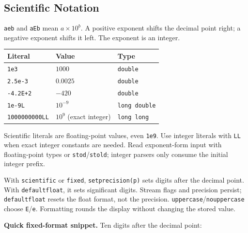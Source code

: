 \begingroup
\raggedright
\subsection{Scientific Notation}
\texttt{aeb} and \texttt{aEb} mean $a\times10^b$. A positive
exponent shifts the decimal point right; a negative exponent shifts
it left. The exponent is an integer.

\begin{center}
\begin{tabular}{lll}
\textbf{Literal} & \textbf{Value} & \textbf{Type} \\
\hline
\texttt{1e3} & $1000$ & \texttt{double} \\
\texttt{2.5e-3} & $0.0025$ & \texttt{double} \\
\texttt{-4.2E+2} & $-420$ & \texttt{double} \\
\texttt{1e-9L} & $10^{-9}$ & \texttt{long double} \\
\texttt{1000000000LL} & $10^9$ (exact integer) & \texttt{long long} \\
\end{tabular}
\end{center}
Scientific literals are floating-point values, even \texttt{1e9}.
Use integer literals with \texttt{LL} when exact integer constants
are needed. Read exponent-form input with floating-point types or
\texttt{stod}/\texttt{stold}; integer parsers only consume the
initial integer prefix.

With \texttt{scientific} or \texttt{fixed}, \texttt{setprecision(p)}
sets digits after the decimal point. With \texttt{defaultfloat},
it sets significant digits. Stream flags and precision persist;
\texttt{defaultfloat} resets the float format, not the precision.
\texttt{uppercase}/\texttt{nouppercase} choose \texttt{E}/\texttt{e}.
Formatting rounds the display without changing the stored value.
\begin{samepage}
\medskip
\textbf{Quick fixed-format snippet.} Ten digits after the decimal point:
\end{samepage}

\endgroup
